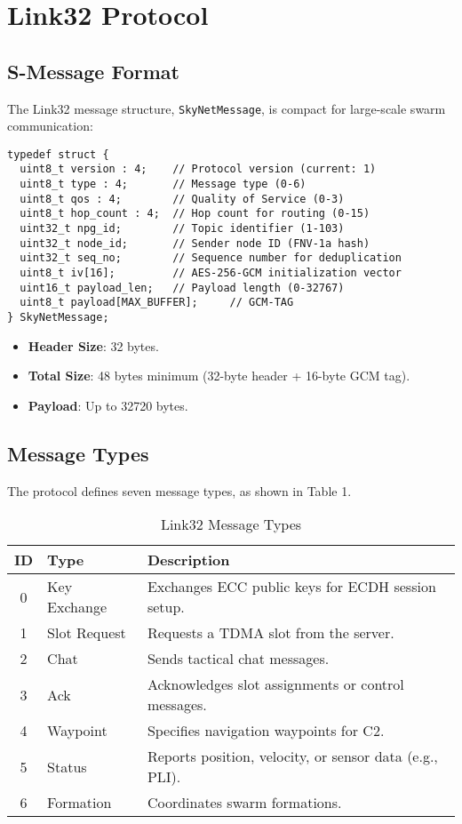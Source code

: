 \documentclass{article}
\begin{document}
\section{Link32 Protocol}

\subsection{S-Message Format}
The Link32 message structure, \texttt{SkyNetMessage}, is compact for large-scale swarm
communication:
\begin{lstlisting}
typedef struct {
  uint8_t version : 4;    // Protocol version (current: 1)
  uint8_t type : 4;       // Message type (0-6)
  uint8_t qos : 4;        // Quality of Service (0-3)
  uint8_t hop_count : 4;  // Hop count for routing (0-15)
  uint32_t npg_id;        // Topic identifier (1-103)
  uint32_t node_id;       // Sender node ID (FNV-1a hash)
  uint32_t seq_no;        // Sequence number for deduplication
  uint8_t iv[16];         // AES-256-GCM initialization vector
  uint16_t payload_len;   // Payload length (0-32767)
  uint8_t payload[MAX_BUFFER];     // GCM-TAG
} SkyNetMessage;
\end{lstlisting}
\begin{itemize}
    \item \textbf{Header Size}: 32 bytes.
    \item \textbf{Total Size}: 48 bytes minimum (32-byte header + 16-byte GCM tag).
    \item \textbf{Payload}: Up to 32720 bytes.
\end{itemize}

\newpage
\subsection{Message Types}
The protocol defines seven message types, as shown in Table 1.

\begin{table}[h]
\centering
\caption{Link32 Message Types}
\begin{tabular}{clp{8cm}}
\hline
\textbf{ID} & \textbf{Type} & \textbf{Description} \\
\hline
0 & Key Exchange & Exchanges ECC public keys for ECDH session setup. \\
1 & Slot Request & Requests a TDMA slot from the server. \\
2 & Chat         & Sends tactical chat messages. \\
3 & Ack          & Acknowledges slot assignments or control messages. \\
4 & Waypoint     & Specifies navigation waypoints for C2. \\
5 & Status       & Reports position, velocity, or sensor data (e.g., PLI). \\
6 & Formation    & Coordinates swarm formations. \\
\hline
\end{tabular}
\end{table}
\end{document}
